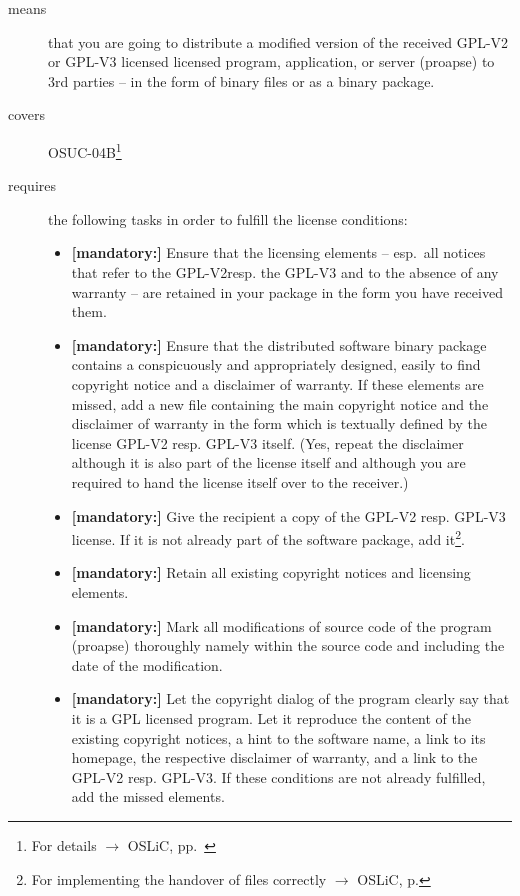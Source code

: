 \begin{description}
\item[means] that you are going to distribute a modified version of the received
GPL-V2 or GPL-V3 licensed licensed pro\-gram, application, or server (proapse)
to 3rd parties -- in the form of binary files or as a binary package.
\item[covers] OSUC-04B\footnote{For details $\rightarrow$ OSLiC, pp.\
\pageref{OSUC-04B-DEF}}

\item[requires] the following tasks in order to fulfill the license conditions:
\begin{itemize}

  \item \textbf{[mandatory:]} Ensure that the licensing elements -- esp.\ all
  notices that refer to the GPL-V2resp. the GPL-V3 and to the absence of any
  warranty -- are retained in your package in the form you have received them.

  \item \textbf{[mandatory:]} Ensure that the distributed software binary
  package contains a conspicuously and appropriately designed, easily to find
  copyright notice and a disclaimer of warranty. If these elements are missed,
  add a new file containing the main copyright notice and the disclaimer of
  warranty in the form which is textually defined by the license GPL-V2 resp.
  GPL-V3 itself. (Yes, repeat the disclaimer although it is also part of the
  license itself and although you are required to hand the license itself over
  to the receiver.)
  
  \item \textbf{[mandatory:]} Give the recipient a copy of the GPL-V2 resp.
  GPL-V3 license. If it is not already part of the software package, add
  it\footnote{For implementing the handover of files correctly $\rightarrow$
  OSLiC, p. \pageref{DistributingFilesHint}}.
  
  \item \textbf{[mandatory:]} Retain all existing copyright notices and
  licensing elements.
  
  \item \textbf{[mandatory:]} Mark all modifications of source code of the
  program (proapse) thoroughly namely within the source code and including
  the date of the modification.

  \item \textbf{[mandatory:]} Let the copyright dialog of the program clearly
  say that it is a GPL licensed program. Let it reproduce the content of the
  existing copyright notices, a hint to the software name, a link to its
  homepage, the respective disclaimer of warranty, and a link to the GPL-V2
  resp. GPL-V3. If these conditions are not already fulfilled, add the missed
  elements.
  

\end{itemize}
\end{description}
